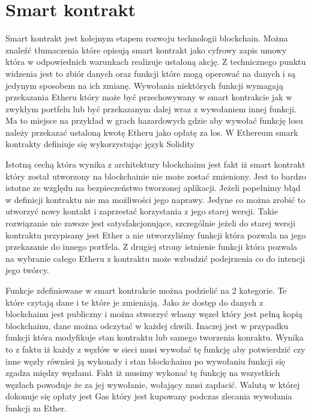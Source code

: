\documentclass[]{llncs}
\begin{document}
\section{Smart kontrakt}

  Smart kontrakt jest kolejnym etapem rozwoju technologii blockchain. Można
  znaleźć tłumaczenia które opisują smart kontrakt jako cyfrowy zapis umowy
  która w odpowiednich warunkach realizuje ustaloną akcję. Z technicznego punktu
  widzenia jest to zbiór danych oraz funkcji które mogą operować na danych i są
  jedynym sposobem na ich zmianę. Wywołania niektórych funkcji wymagają
  przekazania Etheru który może być przechowywany w smart kontrakcie jak w
  zwykłym portfelu lub być przekazanym dalej wraz z wywołaniem innej funkcji. Ma
  to miejsce na przykład w grach hazardowych gdzie aby wywołać funkcję losu
  należy przekazać ustaloną kwotę Etheru jako opłatę za los. W Ethereum smark
  kontrakty definiuje się wykorzystując język Solidity\cite{solidity}

  Istotną cechą która wynika z architektury blockchainu jest fakt iż smart
  kontrakt który został utworzony na blockchainie nie może zostać zmieniony.
  Jest to bardzo istotne ze względu na bezpieczeństwo tworzonej aplikacji.
  Jeżeli popełnimy błąd w definicji kontraktu nie ma możliwości jego naprawy.
  Jedyne co można zrobić to utworzyć nowy kontakt i zaprzestać korzystania z
  jego starej wersji. Takie rozwiązanie nie zawsze jest satysfakcjonujące,
  szczególnie jeżeli do starej wersji kontraktu przypisany jest Ether a nie
  utworzyliśmy funkcji która pozwala na jego przekazanie do innego portfela. Z
  drugiej strony istnienie funkcji która pozwala na wybranie całego Etheru z
  kontraktu może wzbudzić podejrzenia co do intencji jego twórcy.

  Funkcje zdefiniowane w smart kontrakcie można podzielić na 2 kategorie. Te
  które czytają dane i te które je zmieniają. Jako że dostęp do danych z
  blockchainu jest publiczny i można stworzyć własny węzeł który jest pełną
  kopią blockchainu, dane można odczytać w każdej chwili. Inaczej jest w
  przypadku funkcji która modyfikuje stan kontraktu lub samego tworzenia
  konraktu. Wynika to z faktu iż każdy z węzłów w sieci musi wywołać tę funkcję
  aby potwierdzić czy inne węzły również ją wykonały i stan blockchainu po
  wywołaniu funkcji się zgadza między węzłami. Fakt iż musimy wykonać tę funkcję
  na wszystkich węzłach powoduje że za jej wywołanie, wołający musi zapłacić.
  Walutą w której dokonuje się opłaty jest Gas który jest kupowany podczas
  zlecania wywołania funkcji za Ether.
\end{document}
